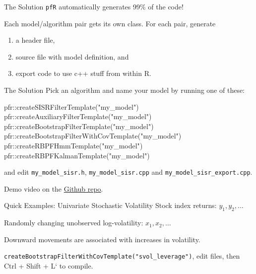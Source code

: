 \documentclass[
  ignorenonframetext,
]{beamer}
\newenvironment{Shaded}{\begin{snugshade}}{\end{snugshade}}
\newcommand{\FunctionTok}[1]{\textcolor[rgb]{0.00,0.00,0.00}{#1}}
\newcommand{\NormalTok}[1]{#1}
\newcommand{\SpecialCharTok}[1]{\textcolor[rgb]{0.00,0.00,0.00}{#1}}
\newcommand{\StringTok}[1]{\textcolor[rgb]{0.31,0.60,0.02}{#1}}
\providecommand{\tightlist}{%
  \setlength{\itemsep}{0pt}\setlength{\parskip}{0pt}}
\begin{document}
\begin{frame}[fragile]{The Solution}
\protect\hypertarget{the-solution-1}{}
\texttt{pfR} automatically generates 99\% of the code!

Each model/algorithm pair gets its own class. For each pair, generate

\begin{enumerate}
\tightlist
\item
  a header file,
\item
  source file with model definition, and
\item
  export code to use c++ stuff from within R.
\end{enumerate}
\end{frame}

\begin{frame}[fragile]{The Solution}
\protect\hypertarget{the-solution-2}{}
Pick an algorithm and name your model by running one of these:

\begin{Shaded}
\begin{Highlighting}[]
\NormalTok{pfr}\SpecialCharTok{::}\FunctionTok{createSISRFilterTemplate}\NormalTok{(}\StringTok{"my\_model"}\NormalTok{)}
\NormalTok{pfr}\SpecialCharTok{::}\FunctionTok{createAuxiliaryFilterTemplate}\NormalTok{(}\StringTok{"my\_model"}\NormalTok{)}
\NormalTok{pfr}\SpecialCharTok{::}\FunctionTok{createBootstrapFilterTemplate}\NormalTok{(}\StringTok{"my\_model"}\NormalTok{)}
\NormalTok{pfr}\SpecialCharTok{::}\FunctionTok{createBootstrapFilterWithCovTemplate}\NormalTok{(}\StringTok{"my\_model"}\NormalTok{)}
\NormalTok{pfr}\SpecialCharTok{::}\FunctionTok{createRBPFHmmTemplate}\NormalTok{(}\StringTok{"my\_model"}\NormalTok{)}
\NormalTok{pfr}\SpecialCharTok{::}\FunctionTok{createRBPFKalmanTemplate}\NormalTok{(}\StringTok{"my\_model"}\NormalTok{)}
\end{Highlighting}
\end{Shaded}

and edit \texttt{my\_model\_sisr.h}, \texttt{my\_model\_sisr.cpp} and
\texttt{my\_model\_sisr\_export.cpp}.

Demo video on the \href{https://github.com/tbrown122387/pfR}{Github
repo}.
\end{frame}

\begin{frame}[fragile]{Quick Examples: Univariate Stochastic Volatility}
\protect\hypertarget{quick-examples-univariate-stochastic-volatility}{}
Stock index returns: \(y_1, y_2, \ldots\)

Randomly changing unobserved log-volatility: \(x_1, x_2, \ldots\)

Downward movements are associated with increases in volatility.

\texttt{createBootstrapFilterWithCovTemplate("svol\_leverage")}, edit
files, then Ctrl + Shift + L` to compile.
\end{frame}
\end{document}
